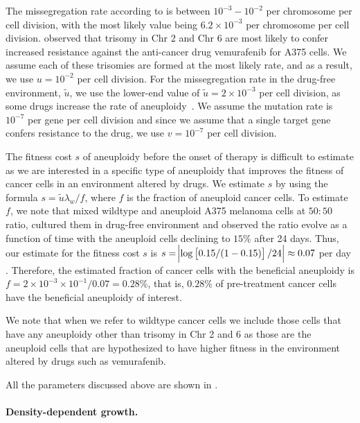 \documentclass[12pt]{extarticle}
\begin{document}
{\color{red} The missegregation rate according to \citet{bakker2023predicting} is between $10^{-3}-10^{-2}$ per chromosome per cell division, with the most likely value being $6.2\times10^{-3}$ per chromosome per cell division.} 
\citet{ippolito2021gene} observed that trisomy in Chr 2 and Chr 6 are most likely to confer increased resistance against the anti-cancer drug vemurafenib for A375 cells. 
We assume each of these trisomies are formed at the most likely rate, and as a result, we use $u=10^{-2}$ per cell division. For the missegregation rate in the drug-free environment, $\tilde{u}$, we use the lower-end value of $\tilde{u}=2\times10^{-3}$ per cell division, as some drugs increase the rate of aneuploidy~\citep{wang2019molecular,mason2017functional}.
We assume the mutation rate is $10^{-7}$ per gene per cell division \citep{loeb2001mutator} and since we assume that a single target gene confers resistance to the drug, we use $v=10^{-7}$ per cell division. 

The fitness cost $s$ of aneuploidy before the onset of therapy is difficult to estimate as we are interested in a specific type of aneuploidy that improves the fitness of cancer cells in an environment altered by drugs.
We estimate $s$ by using the formula $s=\tilde{u}\lambda_w / f$, where $f$ is the fraction of aneuploid cancer cells. To estimate $f$, we note that \citet{lukow2021chromosomal} mixed wildtype and aneuploid A375 melanoma cells at $50:50$ ratio, cultured them in drug-free environment and observed the ratio evolve as a function of time with the aneuploid cells declining to $15\%$ after 24 days. Thus, our estimate for the fitness cost $s$ is $s=\abs{\log\left[0.15/(1-0.15)\right]/24}\approx0.07$ per day \citep{chevin2011measuring}. Therefore, the estimated fraction of cancer cells with the beneficial aneuploidy is $f=2\times10^{-3}\times10^{-1}/0.07=0.28\%$, that is, $0.28\%$ of pre-treatment cancer cells have the beneficial aneuploidy of interest.

We note that when we refer to wildtype cancer cells we include those cells that have any aneuploidy other than trisomy in Chr 2 and 6 as those are the aneuploid cells that are hypothesized to have higher fitness in the environment altered by drugs such as vemurafenib.

All the parameters discussed above are shown in .



\paragraph{Density-dependent growth.}
\end{document}
